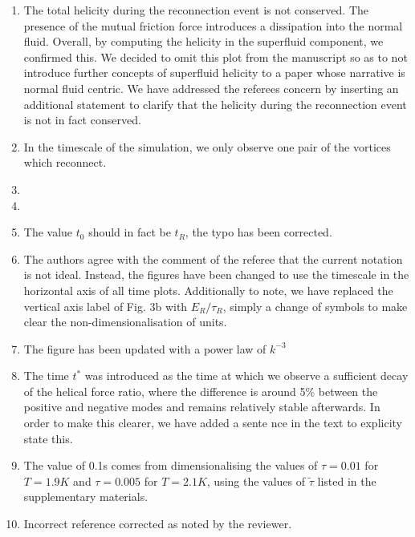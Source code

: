 \documentclass[a4paper,10pt]{letter}
\begin{document}
\begin{enumerate}
    \item The total helicity during the reconnection event is not conserved. The presence of the mutual friction force introduces a dissipation into the normal fluid. Overall, by computing the helicity in the superfluid component, we confirmed this. We decided to omit this plot from the manuscript so as to not introduce further concepts of superfluid helicity to a paper whose narrative is normal fluid centric. We have addressed the referees concern by inserting an additional statement to clarify that the helicity during the reconnection event is not in fact conserved. 
    \item In the timescale of the simulation, we only observe one pair of the vortices which reconnect.  
    \item 
    \item 
    \item The value $t_0$ should in fact be $t_R$, the typo has been corrected.
    \item The authors agree with the comment of the referee that the current notation is not ideal. Instead, the figures have been changed to use the timescale in the horizontal axis of all time plots. Additionally to note, we have replaced the vertical axis label of Fig. 3b with $E_R/\tau_R$, simply a change of symbols to make clear the non-dimensionalisation of units.
    \item The figure has been updated with a power law of $k^{-3}$ 
    \item The time $t^*$ was introduced as the time at which we observe a sufficient decay of the helical force ratio, where the difference is around 5\% between the positive and negative modes and remains relatively stable afterwards. In order to make this clearer, we have added a sente nce in the text to explicity state this.
    \item The value of 0.1s comes from dimensionalising the values of $\tau=0.01$ for $T=1.9K$ and $\tau=0.005$ for $T=2.1K$, using the values of $\tilde{\tau}$ listed in the supplementary materials. 
    \item Incorrect reference corrected as noted by the reviewer.
\end{enumerate}
\end{document}
